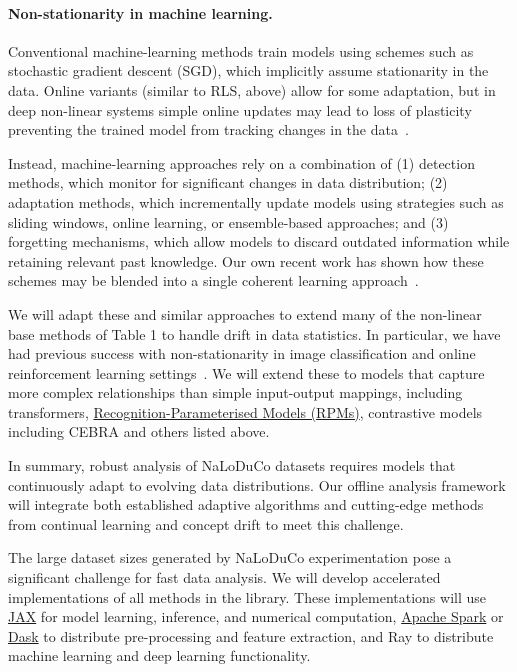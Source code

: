 \paragraph{Non-stationarity in machine learning.}

Conventional machine-learning methods train models using schemes such as
stochastic gradient descent (SGD), which implicitly assume stationarity in the
data.  Online variants (similar to RLS, above) allow for some adaptation, but
in deep non-linear systems simple online updates may lead to loss of plasticity
preventing the trained model from tracking changes in the
data~\cite{ashAndAdams20}.

Instead, machine-learning approaches rely on a combination of (1) detection
methods, which monitor for significant changes in data distribution; (2)
adaptation methods, which incrementally update models using strategies such as
sliding windows, online learning, or ensemble-based approaches; and (3)
forgetting mechanisms, which allow models to discard outdated information while
retaining relevant past knowledge.  Our own recent work has shown how these
schemes may be blended into a single coherent learning
approach~\cite{galashovEtAl24}.

We will adapt these and similar approaches to extend many of the non-linear
base methods of Table 1 to handle drift in data statistics. In particular, we
have had previous success with non-stationarity in image classification and
online reinforcement learning settings~\cite{galashovEtAl24}.  We will extend
these to models that capture more complex relationships than simple
input-output mappings, including transformers,
\href{https://github.com/gatsby-sahani/rpm-aistats-2023}{Recognition-Parameterised
Models (RPMs)}, contrastive models including CEBRA and others listed above.

In summary, robust analysis of NaLoDuCo datasets requires models that
continuously adapt to evolving data distributions. Our offline analysis
framework will integrate both established adaptive algorithms and cutting-edge
methods from continual learning and concept drift to meet this challenge.


The large dataset sizes generated by NaLoDuCo experimentation pose a
significant challenge for fast data analysis. We will develop accelerated
implementations of all methods in the library.  These implementations will use
\href{https://docs.jax.dev/}{JAX} for model learning, inference, and numerical
computation, \href{https://spark.apache.org/}{Apache Spark} or
\href{https://www.dask.org/}{Dask} to distribute pre-processing and feature
extraction, and Ray to distribute machine learning and deep learning
functionality.

